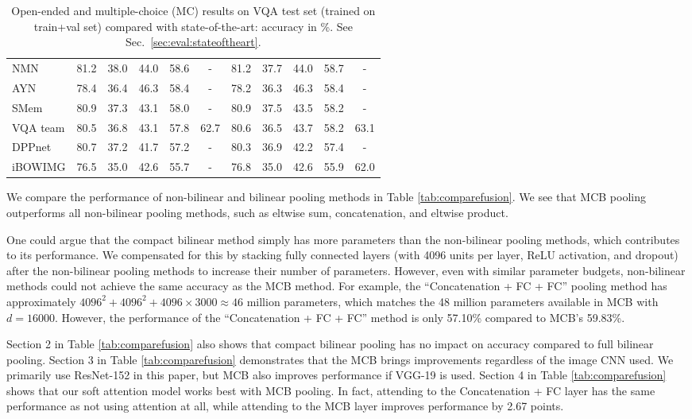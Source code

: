 \documentclass[11pt,letterpaper]{article}
\DeclareRobustCommand{\Secref}[1]{Sec.~\ref{#1}}
\begin{document}
\begin{table*}[t]
\begin{tabular}{lcccccccccc}
NMN \cite{andreas16cvpr} & 81.2 & 38.0 & 44.0 & 58.6 & - & 81.2 & 37.7 & 44.0 & 58.7 & -  \\
AYN \cite{malinowski2016ask} & 78.4 & 36.4 &46.3 &58.4  & -& 78.2&36.3&46.3&58.4 & -\\
    SMem \cite{xu2015ask} & 80.9 & 37.3 & 43.1 & 58.0 & -& 80.9 & 37.5 & 43.5 & 58.2 & - \\
  VQA team \cite{antol2015vqa} & 80.5 & 36.8 & 43.1 & 57.8 & 62.7 & 80.6 & 36.5 & 43.7 & 58.2 & 63.1 \\
  DPPnet \cite{noh2015images} & 80.7 & 37.2 & 41.7 & 57.2 & -& 80.3 & 36.9 & 42.2 & 57.4 & -\\
  iBOWIMG \cite{zhou2015simple}  & 76.5 & 35.0 & 42.6 & 55.7 & -& 76.8 & 35.0 & 42.6 & 55.9 & 62.0 \\
\bottomrule
\end{tabular}
\caption{Open-ended and multiple-choice (MC) results on VQA test set (trained on train+val set) compared with state-of-the-art: accuracy in \%. See \Secref{sec:eval:stateoftheart}.}
\label{tab:vqa_state_of_art}
\vspace{-0.6cm}
\end{table*} 
We compare the performance of non-bilinear and bilinear pooling methods in Table \ref{tab:comparefusion}. We see that MCB pooling outperforms all non-bilinear pooling methods, such as eltwise sum, concatenation, and eltwise product. 

One could argue that the compact bilinear method simply has more parameters than the non-bilinear pooling methods, which contributes to its performance. We compensated for this by stacking fully connected layers (with 4096 units per layer, ReLU activation, and dropout) after the non-bilinear pooling methods to increase their number of parameters. However, even with similar parameter budgets, non-bilinear methods could not achieve the same accuracy as the MCB method. For example, the ``Concatenation + FC + FC'' pooling method has approximately $ 4096^2 + 4096^2 + 4096\times 3000 \approx 46$ million parameters, which matches the 48 million parameters available in MCB with $d=16000$. However, the performance of the ``Concatenation + FC + FC'' method is only 57.10\% compared to MCB's 59.83\%.

Section 2 in Table \ref{tab:comparefusion} also shows that compact bilinear pooling has no impact on accuracy compared to full bilinear pooling. Section 3 in Table \ref{tab:comparefusion} demonstrates that the MCB brings improvements regardless of the image CNN used. We primarily use ResNet-152 in this paper, but MCB also improves performance if VGG-19 is used. Section 4 in Table \ref{tab:comparefusion} shows that our soft attention model works best with MCB pooling. In fact, attending to the Concatenation + FC layer has the same performance as not using attention at all, while attending to the MCB layer improves performance by 2.67 points.
\end{document}
